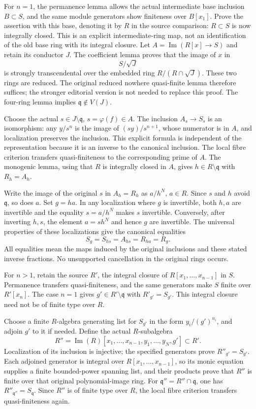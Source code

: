 For \(n=1\), the permanence lemma allows the actual intermediate base inclusion \(B\subset S\), and the same module generators show finiteness over \(B[x_1]\). Prove the assertion with this base, denoting it by \(R\) in the source comparison: \(R\subset S\) is now integrally closed. This is an explicit intermediate-ring map, not an identification of the old base ring with its integral closure. Let \(A=\operatorname{Im}(R[x]\to S)\) and retain its conductor \(J\). The coefficient lemma proves that the image of \(x\) in \[
 S/\sqrt J
\] is strongly transcendental over the embedded ring \(R/(R\cap\sqrt J)\). These two rings are reduced. The original reduced nowhere quasi-finite lemma therefore suffices; the stronger editorial version is not needed to replace this proof. The four-ring lemma implies \(\mathfrak q\notin V(J)\).

Choose the actual \(s\in J\setminus\mathfrak q\), \(s=\varphi(f)\in A\). The inclusion \(A_s\to S_s\) is an isomorphism: any \(y/s^n\) is the image of \((sy)/s^{n+1}\), whose numerator is in \(A\), and localization preserves the inclusion. This explicit formula is independent of the representation because it is an inverse to the canonical inclusion. The local fibre criterion transfers quasi-finiteness to the corresponding prime of \(A\). The monogenic lemma, using that \(R\) is integrally closed in \(A\), gives \(h\in R\setminus\mathfrak q\) with \(R_h=A_h\).

Write the image of the original \(s\) in \(A_h=R_h\) as \(a/h^N\), \(a\in R\). Since \(s\) and \(h\) avoid \(\mathfrak q\), so does \(a\). Set \(g=ha\). In any localization where \(g\) is invertible, both \(h,a\) are invertible and the equality \(s=a/h^N\) makes \(s\) invertible. Conversely, after inverting \(h,s\), the element \(a=s h^N\) and hence \(g\) are invertible. The universal properties of these localizations give the canonical equalities \[
 S_g=S_{hs}=A_{hs}=R_{ha}=R_g.
\] All equalities mean the maps induced by the original inclusions and these stated inverse fractions. No unsupported cancellation in the original rings occurs.

For \(n>1\), retain the source \(R'\), the integral closure of \(R[x_1,\ldots,x_{n-1}]\) in \(S\). Permanence transfers quasi-finiteness, and the same generators make \(S\) finite over \(R'[x_n]\). The case \(n=1\) gives \(g'\in R'\setminus\mathfrak q\) with \(R'_{g'}=S_{g'}\). This integral closure need not be of finite type over \(R\).

Choose a finite \(R\)-algebra generating list for \(S_{g'}\) in the form \(y_i/(g')^{n_i}\), and adjoin \(g'\) to it if needed. Define the actual \(R\)-subalgebra \[
 R''=\operatorname{Im}(R)[x_1,\ldots,x_{n-1},y_1,\ldots,y_N,g']
 \subset R'.
\] Localization of its inclusion is injective; the specified generators prove \(R''_{g'}=S_{g'}\). Each adjoined generator is integral over \(R[x_1,\ldots,x_{n-1}]\), so its monic equation supplies a finite bounded-power spanning list, and their products prove that \(R''\) is finite over that original polynomial-image ring. For \(\mathfrak q''=R''\cap\mathfrak q\), one has \(R''_{\mathfrak q''}=S_{\mathfrak q}\). Since \(R''\) is of finite type over \(R\), the local fibre criterion transfers quasi-finiteness again.

